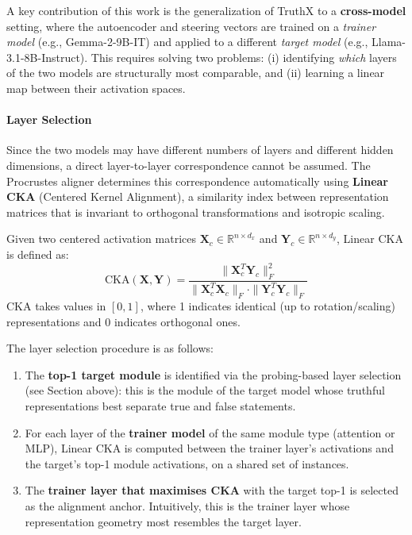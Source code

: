 A key contribution of this work is the generalization of TruthX to a \textbf{cross-model} setting, where the autoencoder and steering vectors are trained on a \textit{trainer model} (e.g., Gemma-2-9B-IT) and applied to a different \textit{target model} (e.g., Llama-3.1-8B-Instruct). This requires solving two problems: (i) identifying \textit{which} layers of the two models are structurally most comparable, and (ii) learning a linear map between their activation spaces.

\paragraph{Layer Selection}


Since the two models may have different numbers of layers and different hidden dimensions, a direct layer-to-layer correspondence cannot be assumed. The Procrustes aligner determines this correspondence automatically using \textbf{Linear CKA} (Centered Kernel Alignment), a similarity index between representation matrices that is invariant to orthogonal transformations and isotropic scaling.

Given two centered activation matrices $\mathbf{X}_c \in \mathbb{R}^{n \times d_x}$ and $\mathbf{Y}_c \in \mathbb{R}^{n \times d_y}$, Linear CKA is defined as:
\begin{equation}
\label{eq:cka_crossmodel}
\mathrm{CKA}(\mathbf{X}, \mathbf{Y}) = \frac{\|\mathbf{X}_c^T \mathbf{Y}_c\|_F^2}{\|\mathbf{X}_c^T \mathbf{X}_c\|_F \cdot \|\mathbf{Y}_c^T \mathbf{Y}_c\|_F}
\end{equation}
CKA takes values in $[0, 1]$, where 1 indicates identical (up to rotation/scaling) representations and 0 indicates orthogonal ones.

The layer selection procedure is as follows:
\begin{enumerate}
    \item The \textbf{top-1 target module} is identified via the probing-based layer selection (see Section above): this is the module of the target model whose truthful representations best separate true and false statements.
    \item For each layer of the \textbf{trainer model} of the same module type (attention or MLP), Linear CKA is computed between the trainer layer's activations and the target's top-1 module activations, on a shared set of instances.
    \item The \textbf{trainer layer that maximises CKA} with the target top-1 is selected as the alignment anchor. Intuitively, this is the trainer layer whose representation geometry most resembles the target layer.
\end{enumerate}

